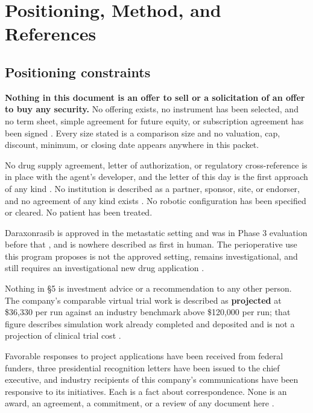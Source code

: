 \section{Positioning, Method, and References}

\subsection{Positioning constraints}

\textbf{Nothing in this document is an offer to sell or a solicitation of an
offer to buy any security.} No offering exists, no instrument has been selected,
and no term sheet, simple agreement for future equity, or subscription agreement
has been signed \cite{secformd2026,safeinstrument2026}. Every size stated is a
comparison size and no valuation, cap, discount, minimum, or closing date appears
anywhere in this packet.

No drug supply agreement, letter of authorization, or regulatory cross-reference
is in place with the agent's developer, and the letter of this day is the first
approach of any kind \cite{revmedexternal2026}. No institution is described as a
partner, sponsor, site, or endorser, and no agreement of any kind exists
\cite{ucsdmoores2026}. No robotic configuration has been specified or cleared. No
patient has been treated.

Daraxonrasib is approved in the metastatic setting and was in Phase 3 evaluation
before that \cite{fdarasonque2026,rasolute302}, and is nowhere described as first
in human. The perioperative use this program proposes is not the approved
setting, remains investigational, and still requires an investigational new drug
application \cite{ecfr2026part312}.

Nothing in \S5 is investment advice or a recommendation to any other person. The
company's comparable virtual trial work is described as \textbf{projected} at
\$36,330 per run against an industry benchmark above \$120,000 per run; that
figure describes simulation work already completed and deposited and is not a
projection of clinical trial cost \cite{capitalplan2026}.

Favorable responses to project applications have been received from federal
funders, three presidential recognition letters have been issued to the chief
executive, and industry recipients of this company's communications have been
responsive to its initiatives. Each is a fact about correspondence. None is an
award, an agreement, a commitment, or a review of any document here
\cite{movein2026}.

